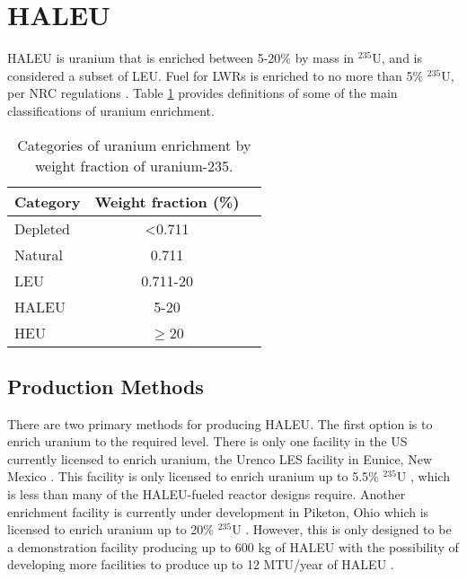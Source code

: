 %
%
%
\section{HALEU}
\gls{HALEU} is uranium that is enriched between 5-20\% by mass in 
$^{235}$U, and is considered a subset of \gls{LEU}. Fuel for \glspl{LWR} 
is enriched to no more than 5\% $^{235}$U, per \gls{NRC} regulations 
\cite{noauthor_10_2021}. Table \ref{tab:enrichemnt} provides definitions 
of some of the 
main classifications of uranium enrichment. 

\begin{table}
    \centering
    \caption{Categories of uranium enrichment by weight fraction of 
    uranium-235.}
    \label{tab:enrichemnt}
    \begin{tabular}{l c c}
        \hline
        Category & Weight fraction (\%)\\\hline
        Depleted & <0.711 \\
        Natural & 0.711 \\
        \gls{LEU} & 0.711-20 \\
        \gls{HALEU} & 5-20 \\
        \gls{HEU} & $\ge$20 \\
        \hline
    \end{tabular}
\end{table}

\subsection{Production Methods}
There are two primary methods for producing \gls{HALEU}. The first 
option is to enrich uranium to the required level. There is only one 
facility in the US currently 
licensed to enrich uranium, the Urenco LES facility in Eunice, 
New Mexico \cite{noauthor_establishing_2022}. This facility is only 
licensed to enrich uranium up to 5.5\% $^{235}$U \cite{noauthor_establishing_2022},
which is less than many of the \gls{HALEU}-fueled reactor designs 
require. Another enrichment facility is currently under development in 
Piketon, Ohio which is licensed to enrich uranium up to 20\% 
$^{235}$U \cite{noauthor_establishing_2022}. However, this is only 
designed to be a demonstration facility producing up to 600 kg of 
\gls{HALEU} \cite{us_nrc_centrus_2021} with the possibility of 
developing more facilities to produce up to 12 MTU/year of \gls{HALEU}
\cite{noauthor_establishing_2022}.

